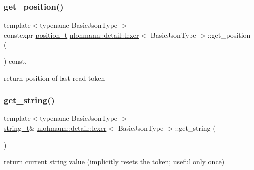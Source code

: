 \subsubsection{\texorpdfstring{get\+\_\+position()}{get\_position()}}
{\footnotesize\ttfamily template$<$typename Basic\+Json\+Type $>$ \\
constexpr \hyperlink{structnlohmann_1_1detail_1_1position__t}{position\+\_\+t} \hyperlink{classnlohmann_1_1detail_1_1lexer}{nlohmann\+::detail\+::lexer}$<$ Basic\+Json\+Type $>$\+::get\+\_\+position (\begin{DoxyParamCaption}{ }\end{DoxyParamCaption}) const\hspace{0.3cm}{\ttfamily [inline]}, {\ttfamily [noexcept]}}



return position of last read token 

\mbox{\label{classnlohmann_1_1detail_1_1lexer_a54aa290ff2f60218a8f35f1ebf81666d}} 
\subsubsection{\texorpdfstring{get\+\_\+string()}{get\_string()}}
{\footnotesize\ttfamily template$<$typename Basic\+Json\+Type $>$ \\
\hyperlink{classnlohmann_1_1detail_1_1lexer_ab63d35c658887592a4b09ad26eb4c795}{string\+\_\+t}\& \hyperlink{classnlohmann_1_1detail_1_1lexer}{nlohmann\+::detail\+::lexer}$<$ Basic\+Json\+Type $>$\+::get\+\_\+string (\begin{DoxyParamCaption}{ }\end{DoxyParamCaption})\hspace{0.3cm}{\ttfamily [inline]}}



return current string value (implicitly resets the token; useful only once) 

\mbox{\label{classnlohmann_1_1detail_1_1lexer_a4aef7e72e539be04e139c34872421f2a}} 
